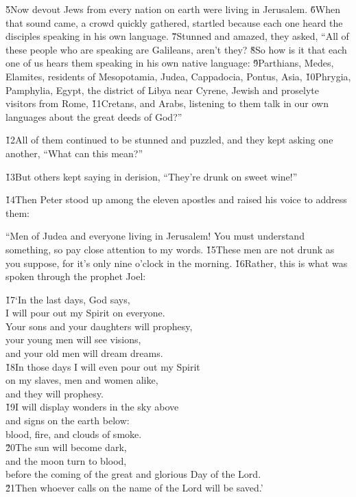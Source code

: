 \v{5}Now devout Jews from every nation on earth were living in Jerusalem. \v{6}When that sound came, a crowd quickly gathered, startled because each one heard the disciples speaking in his own language. \v{7}Stunned and amazed, they asked, ``All of these people who are speaking are Galileans, aren't they? \v{8}So how is it that each one of us hears them speaking in his own native language: \v{9}Parthians, Medes, Elamites, residents of Mesopotamia, Judea, Cappadocia, Pontus, Asia, \v{10}Phrygia, Pamphylia, Egypt, the district of Libya near Cyrene, Jewish and proselyte visitors from Rome, \v{11}Cretans, and Arabs, listening to them talk in our own languages about the great deeds of God?''

\v{12}All of them continued to be stunned and puzzled, and they kept asking one another, ``What can this mean?''

\v{13}But others kept saying in derision, ``They're drunk on sweet wine!''

\v{14}Then Peter stood up among the eleven apostles and raised his voice to address them:

``Men of Judea and everyone living in Jerusalem! You must understand something, so pay close attention to my words. \v{15}These men are not drunk as you suppose, for it's only nine o'clock in the morning. \v{16}Rather, this is what was spoken through the prophet Joel:

\begin{poetry}
\poeml \v{17}`In the last days, God says, \\
\poemll    I will pour out my Spirit on everyone. \\
\poeml Your sons and your daughters will prophesy, \\
\poemll    your young men will see visions, \\
\poemlll       and your old men will dream dreams. \\
\poeml \v{18}In those days I will even pour out my Spirit \\
\poemll    on my slaves, men and women alike, \\
\poemlll       and they will prophesy. \\
\poeml \v{19}I will display wonders in the sky above \\
\poemll    and signs on the earth below: \\
\poemlll       blood, fire, and clouds of smoke. \\
\poeml \v{20}The sun will become dark, \\
\poemll    and the moon turn to blood, \\
\poemlll       before the coming of the great and glorious Day of the Lord. \\
\poeml \v{21}Then whoever calls on the name of the Lord will be saved.'
\end{poetry}

